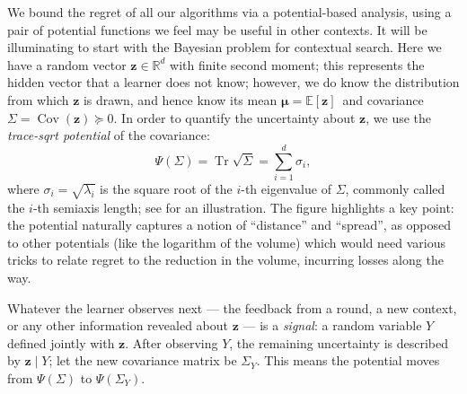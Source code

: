 \documentclass[11pt]{article}
\newcommand{\E}[1]{\mathbb E\left[#1\right]}
\newcommand{\R}{\mathbb R}
\DeclareMathOperator{\Cov}{Cov}
\DeclareMathOperator{\Tr}{Tr}
\newcommand{\bmu}{\boldsymbol\mu}
\newcommand{\bz}{\boldsymbol z}
\begin{document}
\newcommand{\agsqrt}[1]{(#1)^{1/2}}

We bound the regret of all our algorithms via a potential-based
analysis, using a pair of potential functions we feel may be useful in
other contexts.  It will be illuminating to start with the Bayesian
problem {for contextual search}. Here we have a random vector $\bz\in\R^d$ with finite second
moment; this represents the hidden vector that a learner does not
know; however, we do know the distribution {from} which $\bz$ is drawn,
and hence know its mean $\bmu=\E{\bz}${\ and covariance}
$\Sigma=\Cov(\bz)\succeq0$. In order to quantify the uncertainty about
$\bz$, we use the \emph{trace-sqrt potential} of the covariance:
\begin{equation}\label{eq:trace-sqrt-potential}
 \Psi(\Sigma)=\Tr\sqrt\Sigma = \sum_{i=1}^d \sigma_i,
\end{equation}
where $\sigma_i = \sqrt{\lambda_i}$ is the square root of the $i$-th
eigenvalue of $\Sigma$, commonly called the $i$-th semiaxis {length; see}  for an illustration. {The figure highlights a key point:} the
potential naturally captures a notion of ``distance'' and ``spread'',
as opposed to other potentials (like the logarithm of the volume)
which would need various tricks to relate regret to the
reduction in the volume, incurring losses along the way.

Whatever the learner observes next --- the {feedback from a round}, a new
{context, or any other information} revealed about $\bz$ --- is a
\emph{signal}: a random variable $Y$ defined jointly with $\bz$. After
observing $Y$, the remaining uncertainty is described by $\bz\mid Y$;
let the new covariance matrix be $\Sigma_Y$. This means the potential
moves from $\Psi(\Sigma)$ to $\Psi(\Sigma_Y)$.
\end{document}
